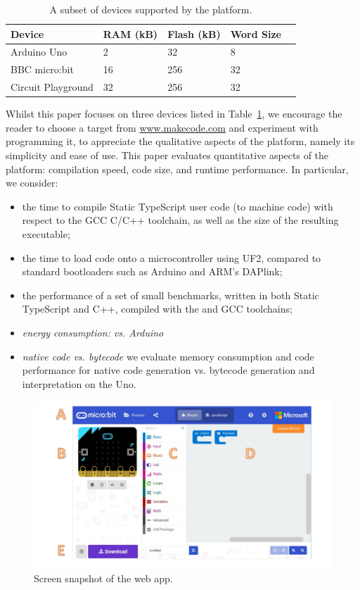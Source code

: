 \begin{table}[]
\centering
\begin{tabular}{|l|l|l|l|l|}
\hline
Device             & RAM (kB) & Flash (kB) & Word Size        \\ \hline
Arduino Uno        & 2        & 32         & 8               \\ \hline
BBC micro:bit      & 16       & 256        & 32              \\ \hline
Circuit Playground & 32       & 256        & 32              \\ \hline
\end{tabular}
\caption{\label{table:devices}A subset of devices supported by the platform.}
\end{table}
Whilst this paper focuses on three devices listed in Table~\ref{table:devices}, we encourage the reader to choose a target
from \url{www.makecode.com} and experiment with programming it, to appreciate the
qualitative aspects of the platform, namely its simplicity and ease of use.
This paper evaluates quantitative aspects of the platform:
compilation speed, code size, and runtime performance.  In particular, we
consider:
\begin{itemize}
\item the time to compile Static TypeScript user code (to machine code) with respect
      to the GCC C/C++ toolchain, as well as the size of the resulting executable;
\item the time to load code onto a microcontroller using UF2, compared to standard bootloaders
      such as Arduino and ARM's DAPlink;
\item the performance of a set of small benchmarks, written in both Static TypeScript and C++,
      compiled with the \MC and GCC toolchains;
\item \emph{energy consumption: \CO vs. Arduino}
\item \emph{native code vs. bytecode} we
      evaluate memory consumption and code performance for native code generation
      vs. bytecode generation and interpretation on the Uno.
\end{itemize}


\begin{figure}[t]
      \includegraphics[width=5in]{screenSnapFig.pdf}
  \caption{\label{fig:screenSnap}Screen snapshot of the \MC web app.}
\end{figure}

